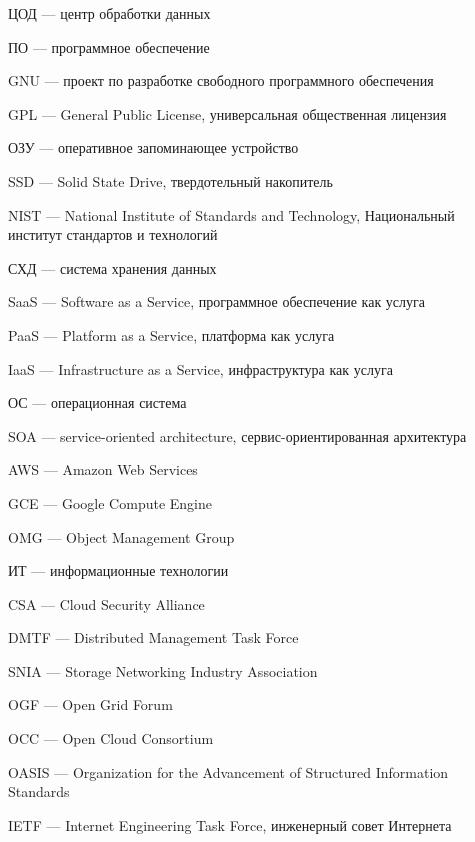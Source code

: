 
\hypertarget{dc}{ЦОД --- центр обработки данных}

\hypertarget{soft}{ПО --- программное обеспечение}

\hypertarget{gnu}{GNU --- проект по разработке свободного программного обеспечения}

\hypertarget{gpl}{GPL --- General Public License, универсальная общественная лицензия}

\hypertarget{ram}{ОЗУ --- оперативное запоминающее устройство}

\hypertarget{ssd}{SSD --- Solid State Drive, твердотельный накопитель}

\hypertarget{nist}{NIST --- National Institute of Standards and Technology, Национальный институт стандартов и технологий}

\hypertarget{storage}{СХД --- система хранения данных}

\hypertarget{saas}{SaaS --- Software as a Service, программное обеспечение как услуга}

\hypertarget{paas}{PaaS --- Platform as a Service, платформа как услуга}

\hypertarget{iaas}{IaaS --- Infrastructure as a Service, инфраструктура как услуга}

\hypertarget{os}{ОС --- операционная система}

\hypertarget{soa}{SOA --- service-oriented architecture, сервис-ориентированная архитектура}

\hypertarget{aws}{AWS --- Amazon Web Services}

\hypertarget{gce}{GCE --- Google Compute Engine}

\hypertarget{omg}{OMG --- Object Management Group}

\hypertarget{it}{ИТ --- информационные технологии}

\hypertarget{csa}{CSA --- Cloud Security Alliance}

\hypertarget{dmtf}{DMTF --- Distributed Management Task Force}

\hypertarget{snia}{SNIA --- Storage Networking Industry Association}

\hypertarget{ogf}{OGF --- Open Grid Forum}

\hypertarget{occ}{OCC --- Open Cloud Consortium}

\hypertarget{oasis}{OASIS --- Organization for the Advancement of Structured Information Standards}

\hypertarget{ietf}{IETF --- Internet Engineering Task Force, инженерный совет Интернета}

